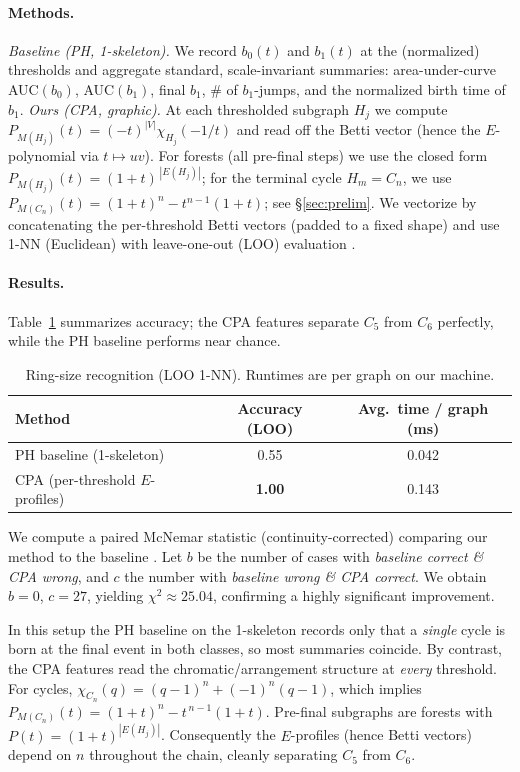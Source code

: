 \documentclass[runningheads]{llncs}
\begin{document}
\paragraph{Methods.}
\emph{Baseline (PH, 1-skeleton).} We record $b_0(t)$ and $b_1(t)$ at the (normalized)
thresholds and aggregate standard, scale-invariant summaries:
area-under-curve AUC$(b_0)$, AUC$(b_1)$, final $b_1$, \# of $b_1$-jumps, and the
normalized birth time of $b_1$.
\emph{Ours (CPA, graphic).} At each thresholded subgraph \(H_j\) we compute
\(P_{M(H_j)}(t) = (-t)^{|V|}\chi_{H_j}(-1/t)\) and read off the Betti vector (hence the
$E$-polynomial via $t\mapsto uv$). For forests (all pre-final steps) we use the
closed form \(P_{M(H_j)}(t)=(1+t)^{\,|E(H_j)|}\); for the terminal cycle
\(H_m=C_n\), we use \(P_{M(C_n)}(t)=(1+t)^n - t^{n-1}(1+t)\); see \S\ref{sec:prelim}.  We
vectorize by concatenating the per-threshold Betti vectors (padded to a fixed
shape) and use 1-NN (Euclidean) with leave-one-out (LOO) evaluation \cite{CoverHart1967}.

\paragraph{Results.}
Table~\ref{tab:expt-summary} summarizes accuracy; the CPA features separate
\(C_5\) from \(C_6\) perfectly, while the PH baseline performs near chance.

\begin{table}[!h]
  \centering
  \caption{Ring-size recognition (LOO 1-NN). Runtimes are per graph on our machine.}
  \label{tab:expt-summary}
  \begin{tabular}{lcc}
    \hline
    Method & Accuracy (LOO) & Avg.\ time / graph (ms) \\
    \hline
    PH baseline (1-skeleton) & 0.55 & 0.042 \\
    CPA (per-threshold $E$-profiles) & \textbf{1.00} & 0.143 \\
    \hline
  \end{tabular}
\end{table}

We compute a paired McNemar statistic (continuity-corrected) comparing our
method to the baseline \cite{McNemar1947}. Let \(b\) be the number of cases with \emph{baseline correct
\& CPA wrong}, and \(c\) the number with \emph{baseline wrong \& CPA correct}.
We obtain \(b=0\), \(c=27\), yielding \(\chi^2\approx 25.04\), confirming a highly
significant improvement.

In this setup the PH baseline on the 1-skeleton records only that a \emph{single}
cycle is born at the final event in both classes, so most summaries coincide. By
contrast, the CPA features read the chromatic/arrangement structure at \emph{every}
threshold. For cycles,
$\chi_{C_n}(q)=(q-1)^n + (-1)^n(q-1)$, which implies 
$P_{M(C_n)}(t)=(1+t)^n - t^{\,n-1}(1+t)$.
Pre-final subgraphs are forests with \(P(t)=(1+t)^{|E(H_j)|}\).
Consequently the \(E\)-profiles (hence Betti vectors) depend on \(n\) throughout the
chain, cleanly separating \(C_5\) from \(C_6\).
\end{document}
